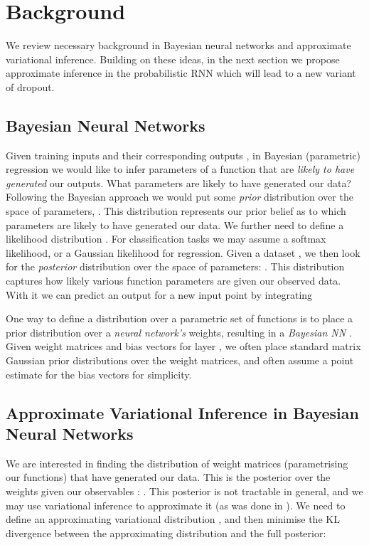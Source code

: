 \documentclass{article}
\theoremstyle{definition}
\begin{document}
\section{Background}

We review necessary background in Bayesian neural networks and approximate variational inference. Building on these ideas, in the next section we propose approximate inference in the probabilistic RNN which will lead to a new variant of dropout.


\newcommand{\h}{\mathbf{h}}


\newcommand{\U}{\mathbf{U}}


\subsection{Bayesian Neural Networks}\label{sec:BNN}

Given training inputs  and their corresponding outputs , in Bayesian (parametric) regression we would like to infer parameters  of a function  that are \textit{likely to have generated} our outputs. 
What parameters are likely to have generated our data? Following the Bayesian approach we would put some \textit{prior} distribution over the space of parameters, . This distribution represents our prior belief as to which parameters are likely to have generated our data.
We further need to define a likelihood distribution .
For classification tasks we may assume a softmax likelihood, 
or a Gaussian likelihood for regression. Given a dataset , we then look for the \textit{posterior} distribution over the space of parameters: .
This distribution captures how likely various function parameters are given our observed data.
With it we can predict an output for a new input point  by integrating


One way to define a distribution over a parametric set of functions is to place a prior distribution over a \textit{neural network's} weights, resulting in a \textit{Bayesian NN} \citep{mackay1992practical,neal1995bayesian}.
Given weight matrices  and bias vectors  for layer , we often place standard matrix Gaussian prior distributions over the weight matrices, 
and often assume a point estimate for the bias vectors for simplicity.


\subsection{Approximate Variational Inference in Bayesian Neural Networks}
We are interested in finding the distribution of weight matrices (parametrising our functions) that have generated our data. This is the posterior over the weights given our observables : . 
This posterior is not tractable in general, and we may use variational inference to approximate it (as was done in \citep{hinton1993keeping,
barber1998ensemble,
graves2011practical,
blundell2015weight}). We need to define an approximating variational distribution , and then minimise the KL divergence between the approximating distribution and the full posterior:
\end{document}
